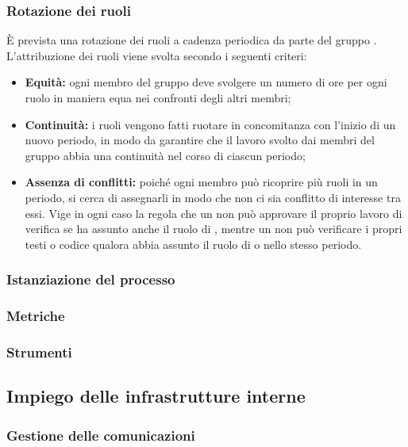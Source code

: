 \subsubsection{Rotazione dei ruoli}
È prevista una rotazione dei ruoli a cadenza periodica da parte del gruppo \groupName{}.\\
L'attribuzione dei ruoli viene svolta secondo i seguenti criteri:
\begin{itemize}
  \item \textbf{Equità:} ogni membro del gruppo deve svolgere un numero di ore per ogni ruolo in maniera equa nei confronti degli altri membri;
  \item \textbf{Continuità:} i ruoli vengono fatti ruotare in concomitanza con l'inizio di un nuovo periodo, in modo da garantire che il lavoro svolto dai membri del gruppo abbia una continuità nel corso di ciascun periodo;
  \item \textbf{Assenza di conflitti:} poiché ogni membro può ricoprire più ruoli in un periodo, si cerca di assegnarli in modo che non ci sia conflitto di interesse tra essi. Vige in ogni caso la regola che un \roleProjectManagerLow{} non può approvare il proprio lavoro di verifica se ha assunto anche il ruolo di \roleVerifierLow{}, mentre un \roleVerifierLow{} non può verificare i propri testi o codice qualora abbia assunto il ruolo di \roleAnalystLow{} o \roleProgrammerLow{} nello stesso periodo.
\end{itemize}
\subsubsection{Istanziazione del processo}
\subsubsection{Metriche}
\subsubsection{Strumenti}
\vspace{2cm}

\subsection{Impiego delle infrastrutture interne} \label{subsection:infrastrutture_interne}

\subsubsection{Gestione delle comunicazioni}
